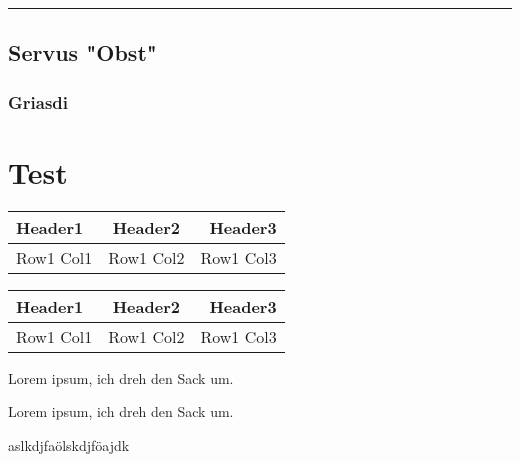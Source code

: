 \vspace{0.4cm}
\hrule
\vspace{0.4cm}

\subsection{Servus "Obst"} 
\subsubsection{Griasdi}

\section{Test}

\begin{table}[h!]
  \centering
  \begin{tabular}{lcr}
    \toprule
    Header1 & Header2 & Header3 \\
    \midrule
    Row1 Col1 & Row1 Col2 & Row1 Col3 \\
    \bottomrule
  \end{tabular}
\end{table}

\begin{table}[h!]
  \centering
  \begin{tabular}{|l|c|r|} 
    \hline
    Header1 & Header2 & Header3 \\
    \hline
    Row1 Col1 & Row1 Col2 & Row1 Col3 \\
    \hline
  \end{tabular}
\end{table}


\begin{tcolorbox}[
  colback=blue!20,
  colframe=blue!60,
  title={Theorem 1},
]
  Lorem ipsum, ich dreh den Sack um.
\end{tcolorbox}

\begin{tcolorbox}[
  colback=green!20,
  colframe=green!40!black,
  title={Title},
]
  Lorem ipsum, ich dreh den Sack um.
\end{tcolorbox}

\begin{tcolorbox}[
  colback=red!20,
  colframe=red!80!black,
  title={Title},
]
  aslkdjfaölskdjföajdk
\end{tcolorbox}

